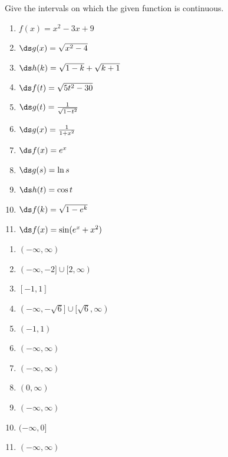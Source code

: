 \begin{enumialphparenastyle}
\begin{ex}
\end{ex}

\begin{ex}
Give the intervals on which the given function is continuous.
\begin{enumerate}

\item {$f(x) = x^2-3x+9$
}

\item {$\ds g(x) = \sqrt{x^2-4}$
}

\item {$\ds h(k) = \sqrt{1-k}+\sqrt{k+1}$
}

\item {$\ds f(t) = \sqrt{5t^2-30}$
}


\item {$\ds g(t) = \frac{1}{\sqrt{1-t^2}}$
}

\item {$\ds g(x) = \frac{1}{1+x^2}$
}

\item {$\ds f(x) = e^x$
}

\item {$\ds g(s) = \ln s$
}

\item {$\ds h(t) = \cos t$
}

\item {$\ds f(k) = \sqrt{1-e^k}$
}
\item {$\ds f(x) = \sin(e^x+x^2)$
}
\end{enumerate}

\begin{sol}
\begin{enumerate}
\item {$(-\infty,\infty)$
}
\item {$(-\infty,-2]\cup [2,\infty)$
}
\item {$[-1,1]$
}
\item {$(-\infty,-\sqrt{6}]\cup [\sqrt{6},\infty)$
}
\item {$(-1,1)$
}
\item {$(-\infty,\infty)$
}
\item {$(-\infty,\infty)$
}
\item {$(0,\infty)$
}
\item {$(-\infty,\infty)$
}
\item 
{$(-\infty,0]$
}
\item 
{$(-\infty,\infty)$
} 
\end{enumerate}
\end{sol}


\end{ex}
\end{enumialphparenastyle}
